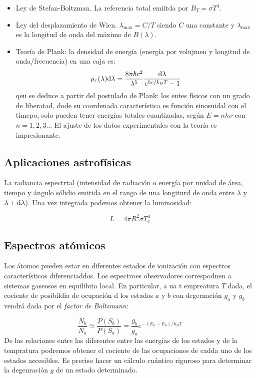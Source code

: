 \begin{itemize}
    \item Ley de Stefan-Boltzman. La referencia total emiitda por $B_T = \sigma T^4$. 
    \item Ley del desplazamiento de Wien. $\lambda_{\max} = C / T$ siendo $C$ una constante y $\lambda_{\max}$ es la longitud de onda del máximo de $B(\lambda)$. 
    \item Teoría de Plank: la densidad de energía (energía por volujmen y longitud de onda/frecuencia) en una caja es:
    \begin{equation}
        \rho_\tau (\lambda) \mathrm{d} \lambda = \frac{8 \pi \hbar c^2}{\lambda^5} \frac{\mathrm{d} \lambda}{e^{hc/k_BT}-1}
    \end{equation}
    qeu se deduce a partir del postulado de Plank: los entes físicos con un grado de liberatad, dode su coordenada característica es función sinosuidal con el timepo, solo pueden tener energías totales cuantizadas, según $E=n h \nu$ con $n=1,2,3...$ El ajuste de los datos experimentales con la teoría es impresionante. 
\end{itemize}

\subsection{Aplicaciones astrofísicas}

La radiancia espectrtal (intensidad de radiación o energía por unidad de área, tiempo y ángulo sólidio emitida en el rango de una longiturd de onda entre $\lambda$ y $\lambda + \mathrm{d} \lambda$). Una vez integrada podemos obtener la luminosidad:

\begin{equation}
    L = 4 \pi R^2 \sigma T^4_e
\end{equation}

\subsection{Espectros atómicos}

Los átomos pueden estar en diferentes estados de ionización con espectros característicos diferenciaddos. Los espectroes observadores correspodnen a sistemas gaseosos en equilibrio local. En particular, a ua t empreatura $T$ dada, el cociente de posibildia de ocupación d los estados $a$ y $b$ con degernación  $g_a$ y $g_b$ vendrá dada por el \textit{factor de Boltzmann}: 

\begin{equation}
    \frac{N_b}{N_a} \simeq \frac{P(S_b)}{P(S_a)} = \frac{g_b}{g_a} e^{-(E_a-E_b)/k_BT}
\end{equation}
De las relaciones entre las diferentes entre las energías de los estados y de la tempratura podremos obtener el cociente de las ocupaciones de cadda uno de los estados accesibles. Es preciso hacer un cálculo cuántico riguroso para determinar la degenración $g$ de un estado determinado. 


